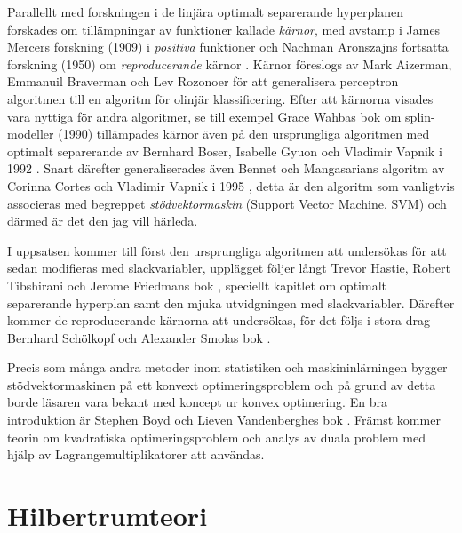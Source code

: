 \documentclass[a4paper, 12pt]{report}
\theoremstyle{definition}
\theoremstyle{remark}
\begin{document}
Parallellt med forskningen i de linjära optimalt separerande hyperplanen forskades om tillämpningar av funktioner kallade \emph{kärnor}, med avstamp i James Mercers forskning (1909) i \emph{positiva} funktioner \cite{Mercer} och Nachman Aronszajns fortsatta forskning (1950) om \emph{reproducerande} kärnor \cite{Aronszajn}.
Kärnor föreslogs av Mark Aizerman, Emmanuil Braverman och Lev Rozonoer \cite{Aizerman} för att generalisera perceptron algoritmen till en algoritm för olinjär klassificering.
Efter att kärnorna visades vara nyttiga för andra algoritmer, se till exempel Grace Wahbas bok om splin-modeller (1990) \cite{Grace} tillämpades kärnor även på den ursprungliga algoritmen med optimalt separerande av Bernhard Boser, Isabelle Gyuon och Vladimir Vapnik i 1992 \cite{BoserGyuonVapnik}.
Snart därefter generaliserades även Bennet och Mangasarians algoritm av Corinna Cortes och Vladimir Vapnik i 1995 \cite{CortesVapnik}, detta är den algoritm som vanligtvis associeras med begreppet \emph{stödvektormaskin} (Support Vector Machine, SVM) och därmed är det den jag vill härleda.

I uppsatsen kommer till först den ursprungliga algoritmen att undersökas för att sedan modifieras med slackvariabler, upplägget följer långt Trevor Hastie, Robert Tibshirani och Jerome Friedmans bok \cite{ESL}, speciellt kapitlet om optimalt separerande hyperplan samt den mjuka utvidgningen med slackvariabler.
Därefter kommer de reproducerande kärnorna att undersökas, för det följs i stora drag Bernhard Schölkopf och Alexander Smolas bok \cite{LearningKernels}.

Precis som många andra metoder inom statistiken och maskininlärningen bygger stödvektormaskinen på ett konvext optimeringsproblem och på grund av detta borde läsaren vara bekant med koncept ur konvex optimering.
En bra introduktion är Stephen Boyd och Lieven Vandenberghes bok \cite{Boyd}.
Främst kommer teorin om kvadratiska optimeringsproblem och analys av duala problem med hjälp av Lagrangemultiplikatorer att användas.


\chapter{Hilbertrumteori}\label{chap:hilbert}
\end{document}
